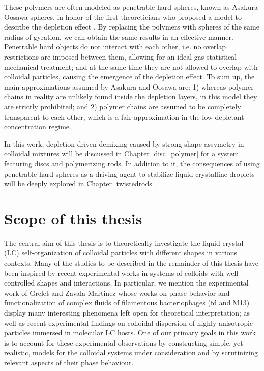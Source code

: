 These polymers are often modeled as penetrable hard spheres, known as Asakura-Oosawa spheres, in honor of the first theoreticians who proposed a model to describe the depletion effect \cite{ASAKURA54,ASAKURA58,Vrijdepletie}. By replacing the polymers with spheres of the same radius of gyration, we can obtain the same results in an effective manner. Penetrable hard objects do not interact with each other, i.e. no overlap restrictions are imposed between them, allowing for an ideal gas statistical mechanical treatment; and at the same time they are not allowed to overlap with colloidal particles, causing the emergence of the depletion effect. To sum up, the main approximations assumed by Asakura and Oosawa are: 1) whereas polymer chains in reality are unlikely found inside the depletion layers, in this model they are strictly prohibited; and 2) polymer chains are assumed to be completely transparent to each other, which is a fair approximation in the low depletant concentration regime.

In this work, depletion-driven demixing caused by strong shape assymetry in colloidal mixtures will be discussed in Chapter \ref{disc_polymer} for a system featuring discs and polymerizing rods. In addition to it, the consequences of using penetrable hard spheres as a driving agent to stabilize liquid crystalline droplets will be deeply explored in Chapter \ref{twistedrods}.

\section{Scope of this thesis}



The central aim of this thesis is to theoretically investigate the liquid crystal (LC) self-organization of colloidal particles with different shapes in various contexts. Many of the studies to be described in the remainder of this thesis have been inspired by recent experimental works in systems of colloids with well-controlled shapes and interactions. In particular, we mention the experimental work of Grelet \cite{Grelet2014} and Zavala-Martinez \cite{zaval2022} whose works on phase behavior and functionalization of complex fluids of filamentous bacteriophages (fd and M13) display many interesting phenomena left open for theoretical interpretation; as well as recent experimental findings \cite{senyuk2021nematoelasticity,mundoor2021} on colloidal dispersion of highly anisotropic particles immersed in molecular LC hosts. One of our primary goals in this work is to account for these experimental observations by constructing simple, yet realistic,  models for the colloidal systems under consideration and by scrutinizing relevant aspects of their phase behaviour.

